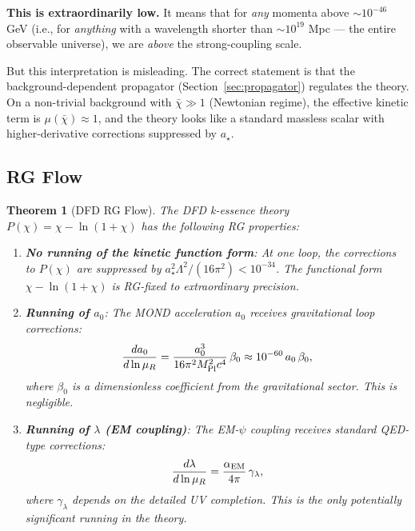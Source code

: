 \documentclass[11pt,a4paper]{article}
\newtheorem{theorem}{Theorem}
\begin{document}
\textbf{This is extraordinarily low.} It means that for \emph{any} momenta above $\sim 10^{-46}$ GeV (i.e., for \emph{anything} with a wavelength shorter than $\sim 10^{19}$ Mpc --- the entire observable universe), we are \emph{above} the strong-coupling scale.

But this interpretation is misleading. The correct statement is that the background-dependent propagator (Section~\ref{sec:propagator}) regulates the theory. On a non-trivial background with $\bar\chi \gg 1$ (Newtonian regime), the effective kinetic term is $\mu(\bar\chi) \approx 1$, and the theory looks like a standard massless scalar with higher-derivative corrections suppressed by $a_\star$.

\subsection{RG Flow}
\label{sec:RG-flow}

\begin{theorem}[DFD RG Flow]
\label{thm:RG}
The DFD k-essence theory $P(\chi) = \chi - \ln(1+\chi)$ has the following RG properties:
\begin{enumerate}
\item \textbf{No running of the kinetic function form}: At one loop, the corrections to $P(\chi)$ are suppressed by $a_\star^2\Lambda^2/(16\pi^2) < 10^{-34}$. The functional form $\chi - \ln(1+\chi)$ is RG-fixed to extraordinary precision.

\item \textbf{Running of $a_0$}: The MOND acceleration $a_0$ receives gravitational loop corrections:
\begin{equation}
\frac{da_0}{d\ln\mu_R} = \frac{a_0^3}{16\pi^2 M_{\rm Pl}^2 c^4}\,\beta_0
\approx 10^{-60}\,a_0\,\beta_0,
\end{equation}
where $\beta_0$ is a dimensionless coefficient from the gravitational sector. This is negligible.

\item \textbf{Running of $\lambda$ (EM coupling)}: The EM-$\psi$ coupling receives standard QED-type corrections:
\begin{equation}
\frac{d\lambda}{d\ln\mu_R} = \frac{\alpha_{\rm EM}}{4\pi}\,\gamma_\lambda,
\end{equation}
where $\gamma_\lambda$ depends on the detailed UV completion. This is the \emph{only} potentially significant running in the theory.
\end{enumerate}
\end{theorem}
\end{document}
